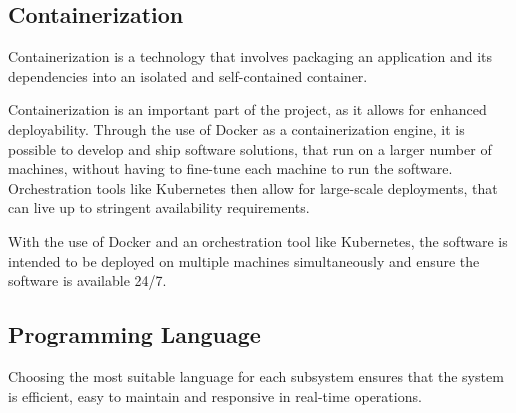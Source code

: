 

\subsection{Containerization} %

Containerization is a technology that involves packaging an application and its dependencies into an isolated and self-contained container.

Containerization is an important part of the project, as it allows for enhanced deployability. Through the use of Docker as a containerization engine, it is possible to develop and ship software solutions, that run on a larger number of machines, without having to fine-tune each machine to run the software. Orchestration tools like Kubernetes then allow for large-scale deployments, that can live up to stringent availability requirements. 

With the use of Docker and an orchestration tool like Kubernetes, the software is intended to be deployed on multiple machines simultaneously and ensure the software is available 24/7.


\subsection{Programming Language} %
Choosing the most suitable language for each subsystem ensures that the system is efficient, easy to maintain and responsive in real-time operations.

